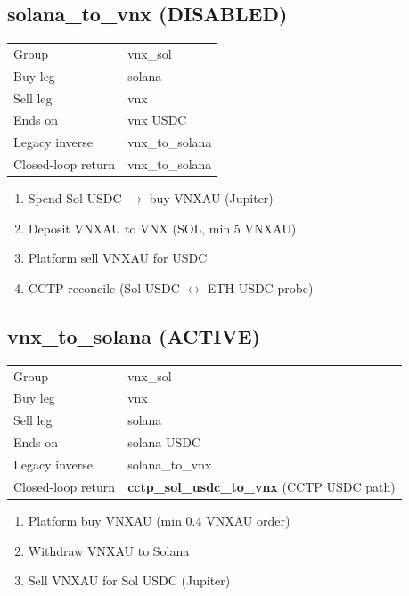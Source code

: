 \documentclass[11pt,a4paper]{article}
\begin{document}
\subsection*{\textcolor{warnred}{solana\_to\_vnx} (DISABLED)}
\begin{tabular}{@{}ll@{}}
Group & vnx\_sol \\
Buy leg & solana \\
Sell leg & vnx \\
Ends on & vnx USDC \\
Legacy inverse & vnx\_to\_solana \\
Closed-loop return & vnx\_to\_solana \\
\end{tabular}
\begin{enumerate}[nosep,leftmargin=*]
\item Spend Sol USDC $\rightarrow$ buy VNXAU (Jupiter)
\item Deposit VNXAU to VNX (SOL, min 5 VNXAU)
\item Platform sell VNXAU for USDC
\item CCTP reconcile (Sol USDC $\leftrightarrow$ ETH USDC probe)
\end{enumerate}
\subsection*{\textcolor{okgreen}{vnx\_to\_solana} (ACTIVE)}
\begin{tabular}{@{}ll@{}}
Group & vnx\_sol \\
Buy leg & vnx \\
Sell leg & solana \\
Ends on & solana USDC \\
Legacy inverse & solana\_to\_vnx \\
Closed-loop return & \textbf{cctp\_sol\_usdc\_to\_vnx} (CCTP USDC path) \\
\end{tabular}
\begin{enumerate}[nosep,leftmargin=*]
\item Platform buy VNXAU (min 0.4 VNXAU order)
\item Withdraw VNXAU to Solana
\item Sell VNXAU for Sol USDC (Jupiter)
\end{enumerate}
\end{document}
